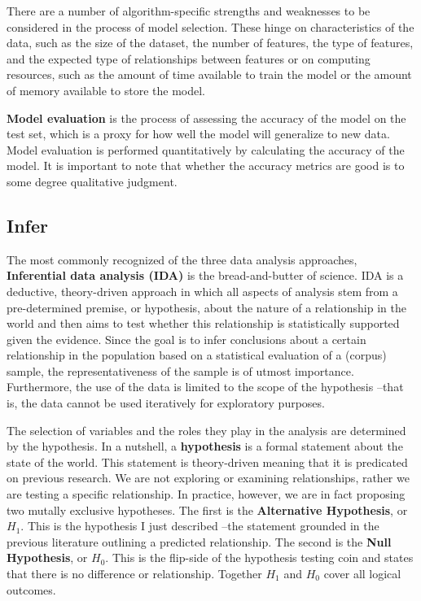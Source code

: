\documentclass[
  letterpaper,
]{latex/krantz}
\theoremstyle{definition}
\theoremstyle{remark}
\begin{document}
There are a number of algorithm-specific strengths and weaknesses to be
considered in the process of model selection. These hinge on
characteristics of the data, such as the size of the dataset, the number
of features, the type of features, and the expected type of
relationships between features or on computing resources, such as the
amount of time available to train the model or the amount of memory
available to store the model.

\textbf{Model evaluation} is the process of assessing the accuracy of
the model on the test set, which is a proxy for how well the model will
generalize to new data. Model evaluation is performed quantitatively by
calculating the accuracy of the model. It is important to note that
whether the accuracy metrics are good is to some degree qualitative
judgment.

\subsection{Infer}\label{sec-aa-infer}

The most commonly recognized of the three data analysis approaches,
\textbf{Inferential data analysis (IDA)} is the bread-and-butter of
science. IDA is a deductive, theory-driven approach in which all aspects
of analysis stem from a pre-determined premise, or hypothesis, about the
nature of a relationship in the world and then aims to test whether this
relationship is statistically supported given the evidence. Since the
goal is to infer conclusions about a certain relationship in the
population based on a statistical evaluation of a (corpus) sample, the
representativeness of the sample is of utmost importance. Furthermore,
the use of the data is limited to the scope of the hypothesis --that is,
the data cannot be used iteratively for exploratory purposes.

The selection of variables and the roles they play in the analysis are
determined by the hypothesis. In a nutshell, a \textbf{hypothesis} is a
formal statement about the state of the world. This statement is
theory-driven meaning that it is predicated on previous research. We are
not exploring or examining relationships, rather we are testing a
specific relationship. In practice, however, we are in fact proposing
two mutally exclusive hypotheses. The first is the \textbf{Alternative
Hypothesis}, or \(H_1\). This is the hypothesis I just described --the
statement grounded in the previous literature outlining a predicted
relationship. The second is the \textbf{Null Hypothesis}, or \(H_0\).
This is the flip-side of the hypothesis testing coin and states that
there is no difference or relationship. Together \(H_1\) and \(H_0\)
cover all logical outcomes.
\end{document}
